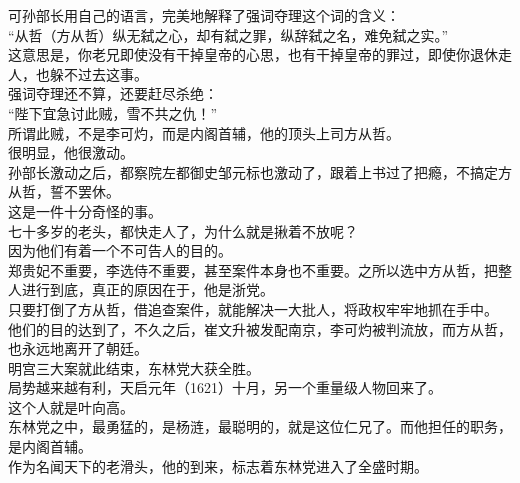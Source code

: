 \begin{multicols}{\theparacolNo}
可孙部长用自己的语言，完美地解释了强词夺理这个词的含义：\\

“从哲（方从哲）纵无弑之心，却有弑之罪，纵辞弑之名，难免弑之实。”\\

这意思是，你老兄即使没有干掉皇帝的心思，也有干掉皇帝的罪过，即使你退休走人，也躲不过去这事。\\

强词夺理还不算，还要赶尽杀绝：\\

“陛下宜急讨此贼，雪不共之仇！”\\

所谓此贼，不是李可灼，而是内阁首辅，他的顶头上司方从哲。\\

很明显，他很激动。\\

孙部长激动之后，都察院左都御史邹元标也激动了，跟着上书过了把瘾，不搞定方从哲，誓不罢休。\\

这是一件十分奇怪的事。\\

七十多岁的老头，都快走人了，为什么就是揪着不放呢？\\

因为他们有着一个不可告人的目的。\\

郑贵妃不重要，李选侍不重要，甚至案件本身也不重要。之所以选中方从哲，把整人进行到底，真正的原因在于，他是浙党。\\

只要打倒了方从哲，借追查案件，就能解决一大批人，将政权牢牢地抓在手中。\\

他们的目的达到了，不久之后，崔文升被发配南京，李可灼被判流放，而方从哲，也永远地离开了朝廷。\\

明宫三大案就此结束，东林党大获全胜。\\

局势越来越有利，天启元年（1621）十月，另一个重量级人物回来了。\\

这个人就是叶向高。\\

东林党之中，最勇猛的，是杨涟，最聪明的，就是这位仁兄了。而他担任的职务，是内阁首辅。\\

作为名闻天下的老滑头，他的到来，标志着东林党进入了全盛时期。\\


\end{multicols}
